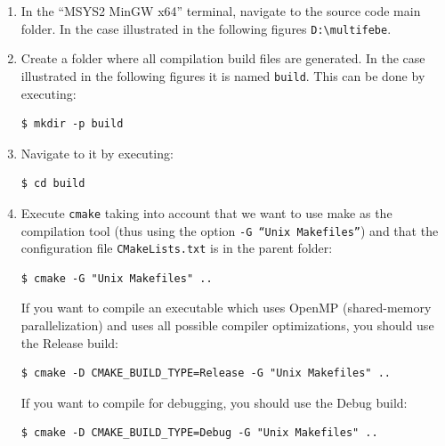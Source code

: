 \documentclass[a4paper,fleqn]{book}
\begin{document}
\begin{enumerate}
\begin{enumerate}
    \item Install GNU Make, CMake and NSIS:
\begin{Verbatim}[frame=single, fontsize=\footnotesize]
$ pacman -S gcc make mingw-w64-x86_64-make cmake mingw-w64-x86_64-cmake mingw-w64-x86_64-nsis
\end{Verbatim}
    \item Install OpenBLAS library:
\begin{Verbatim}[frame=single, fontsize=\small]
$ pacman -S gcc mingw-w64-x86_64-openblas
\end{Verbatim}
\end{enumerate}
  \item In the ``MSYS2  MinGW x64'' terminal, navigate to the source code main folder. In the case illustrated in the following figures \texttt{D:\textbackslash multifebe}.
  \item Create a folder where all compilation build files are generated. In the case illustrated in the following figures it is named \texttt{build}. This can be done by executing:
\begin{Verbatim}[frame=single, fontsize=\small]
$ mkdir -p build
\end{Verbatim}
  \item Navigate to it by executing:
\begin{Verbatim}[frame=single, fontsize=\small]
$ cd build
\end{Verbatim}
  \item Execute \texttt{cmake} taking into account that we want to use make as the compilation tool (thus using the option \texttt{-G ``Unix Makefiles''}) and that the configuration file \texttt{CMakeLists.txt} is in the parent folder:
\begin{Verbatim}[frame=single, fontsize=\small]
$ cmake -G "Unix Makefiles" ..
\end{Verbatim}
If you want to compile an executable which uses OpenMP (shared-memory parallelization) and uses all possible compiler optimizations, you should use the Release build:
\begin{Verbatim}[frame=single, fontsize=\small]
    $ cmake -D CMAKE_BUILD_TYPE=Release -G "Unix Makefiles" ..
\end{Verbatim}
If you want to compile for debugging, you should use the Debug build:
\begin{Verbatim}[frame=single, fontsize=\small]
    $ cmake -D CMAKE_BUILD_TYPE=Debug -G "Unix Makefiles" ..
\end{Verbatim}
  \begin{figure}[h]

\end{figure}
\end{enumerate}
\end{document}
